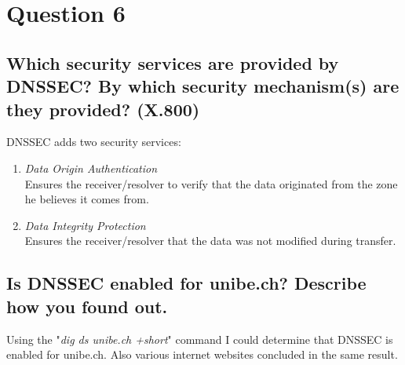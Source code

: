 \documentclass{report}
\begin{document}
	\section{Question 6}
	\startsection
		\renewcommand{\thesubsection}{\thesection.\Alph{subsection}}
		\subsection{Which security services are provided by DNSSEC? By which security mechanism(s) are they provided? (X.800)}
		\startsubsection
			DNSSEC adds two security services:
			\begin{enumerate}
				\item \textit{Data Origin Authentication} \\
				Ensures the receiver/resolver to verify that the data originated from the zone he believes it comes from.
				\item \textit{Data Integrity Protection} \\
				Ensures the receiver/resolver that the data was not modified during transfer.
			\end{enumerate}
		\closesection
		\subsection{Is DNSSEC enabled for unibe.ch? Describe how you found out.}
		\startsubsection
			Using the "\textit{dig ds unibe.ch +short}" command I could determine that DNSSEC is enabled for unibe.ch. Also various internet websites concluded in the same result.
		\closesection
	\closesection
\end{document}
